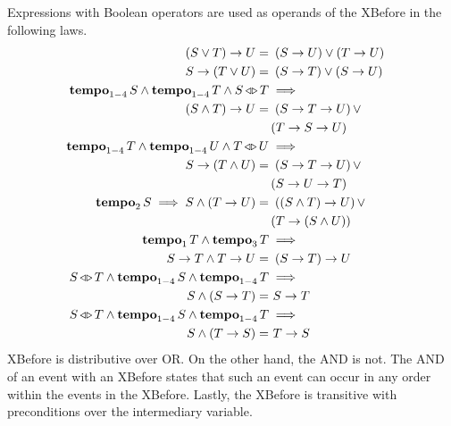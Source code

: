 \documentclass[12pt,openright,twoside,a4paper,oldfontcommands,english,brazil,final]{abntex2}
\theoremstyle{theo}
\def\xbeforeop{\ensuremath\rightarrow}
\newcommand{\xbefore}[2]{\ensuremath #1 \xbeforeop #2 }
\def\tempoop{\ensuremath\operatorname{\mathbf{tempo}}}
\newcommand{\tempo}[2][1-4]{\ensuremath\tempoop_{#1} #2}
\def\independenteventsop{\ensuremath\operatorname{\triangleleft\triangleright}}
\newcommand{\independentevents}[2]{\ensuremath #1 \independenteventsop #2}
\newcommand{\parsin}[1]{\ensuremath\left( #1 \right)}
\begin{document}
Expressions with Boolean operators are used as operands of the \ac{XBefore} in the following laws.
%
\begin{subequations}
\label{thms:xbefore-boolean}
\begin{align}
\xbefore{\left(S \lor T\right)}{U} =&~
  \parsin{\xbefore{S}{U}} \lor \parsin{\xbefore{T}{U}} &
  \label{thm:xbefore-sup-1}\\
\xbefore{S}{\left(T \lor U\right)} =&~
  \parsin{\xbefore{S}{T}} \lor \parsin{\xbefore{S}{U}} &
  \label{thm:xbefore-sup-2}\\
\tempo{S} \land \tempo{T} \land \independentevents{S}{T} & \implies\nonumber \\
  \xbefore{\left(S \land T\right)}{U} =&~
  \parsin{\xbefore{\xbefore{S}{T}}{U}} \lor \nonumber\\
  &\parsin{\xbefore{\xbefore{T}{S}}{U}} &
  \label{thm:xbefore-inf-1}\\
\tempo{T} \land \tempo{U} \land \independentevents{T}{U} & \implies \nonumber\\
  \xbefore{S}{\left(T \land U\right)} =&~
  \parsin{\xbefore{S}{\xbefore{T}{U}}} \lor \nonumber\\
  &\parsin{\xbefore{S}{\xbefore{U}{T}}} &
  \label{thm:xbefore-inf-2}\\
\tempo[2]{S} \implies S \land \parsin{\xbefore{T}{U}} =&~
  \parsin{\xbefore{\parsin{S \land T}}{U}} \lor \nonumber\\
  &\parsin{\xbefore{T}{\parsin{S \land U}}} &
  \label{thm:and_xbefore_equiv_or_xbefore}\\
\tempo[1]{T} \land \tempo[3]{T} &\implies\nonumber\\
  \xbefore{S}{T} \land \xbefore{T}{U} =&~
  \xbefore{\left(\xbefore{S}{T}\right)}{U}
  & 
  \label{thm:inf_xbefore_trans}\\
\independentevents{S}{T} \land \tempo[1-4]{S} \land \tempo[1-4]{T} & \implies\nonumber\\
  S \land \left(\xbefore{S}{T}\right) =&~ \xbefore{S}{T}
  \label{thm:xbefore_inf_absorb_1}\\
\independentevents{S}{T} \land \tempo[1-4]{S} \land \tempo[1-4]{T} & \implies\nonumber\\
  S \land \left(\xbefore{T}{S}\right) =&~ \xbefore{T}{S}
  \label{thm:xbefore_inf_absorb_2}
\end{align}
\end{subequations}
%
\ac{XBefore} is distributive over \ac{OR}.
On the other hand, the \ac{AND} is not.
The \ac{AND} of an event with an \ac{XBefore} states that such an event can occur in any order within the events in the \ac{XBefore}.
Lastly, the \ac{XBefore} is transitive with preconditions over the intermediary variable.
\end{document}
